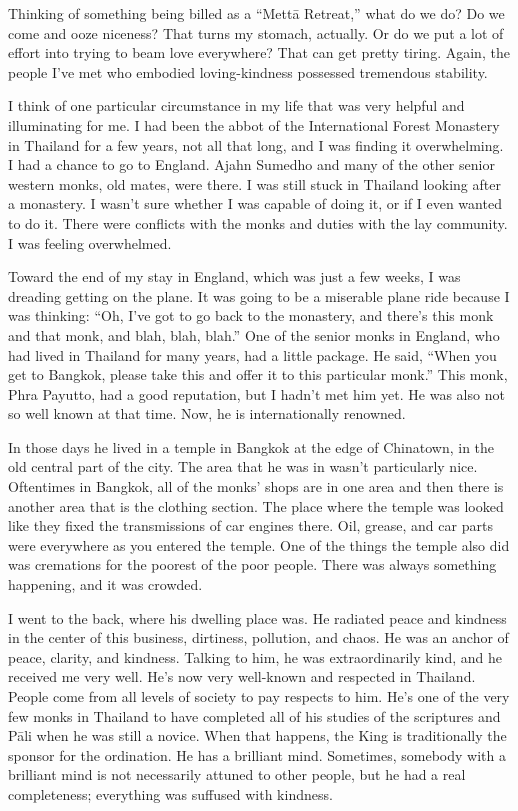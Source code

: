 Thinking of something being billed as a “Mettā Retreat,” what do we do?
Do we come and ooze niceness? That turns my stomach, actually. Or do we
put a lot of effort into trying to beam love everywhere? That can get
pretty tiring. Again, the people I’ve met who embodied loving-kindness
possessed tremendous stability.

I think of one particular circumstance in my life that was very helpful
and illuminating for me. I had been the abbot of the International
Forest Monastery in Thailand for a few years, not all that long, and I
was finding it overwhelming. I had a chance to go to England. Ajahn
Sumedho and many of the other senior western monks, old mates, were
there. I was still stuck in Thailand looking after a monastery. I wasn’t
sure whether I was capable of doing it, or if I even wanted to do it.
There were conflicts with the monks and duties with the lay community. I
was feeling overwhelmed.

Toward the end of my stay in England, which was just a few weeks, I was
dreading getting on the plane. It was going to be a miserable plane ride
because I was thinking: “Oh, I’ve got to go back to the monastery, and
there’s this monk and that monk, and blah, blah, blah.” One of the
senior monks in England, who had lived in Thailand for many years, had a
little package. He said, “When you get to Bangkok, please take this and
offer it to this particular monk.” This monk, Phra Payutto, had a good
reputation, but I hadn’t met him yet. He was also not so well known at
that time. Now, he is internationally renowned.

In those days he lived in a temple in Bangkok at the edge of Chinatown,
in the old central part of the city. The area that he was in wasn’t
particularly nice. Oftentimes in Bangkok, all of the monks’ shops are in
one area and then there is another area that is the clothing section.
The place where the temple was looked like they fixed the transmissions
of car engines there. Oil, grease, and car parts were everywhere as you
entered the temple. One of the things the temple also did was cremations
for the poorest of the poor people. There was always something
happening, and it was crowded.

I went to the back, where his dwelling place was. He radiated peace and
kindness in the center of this business, dirtiness, pollution, and
chaos. He was an anchor of peace, clarity, and kindness. Talking to him,
he was extraordinarily kind, and he received me very well. He’s now very
well-known and respected in Thailand. People come from all levels of
society to pay respects to him. He’s one of the very few monks in
Thailand to have completed all of his studies of the scriptures and Pāli
when he was still a novice. When that happens, the King is traditionally
the sponsor for the ordination. He has a brilliant mind. Sometimes,
somebody with a brilliant mind is not necessarily attuned to other
people, but he had a real completeness; everything was suffused with
kindness.

